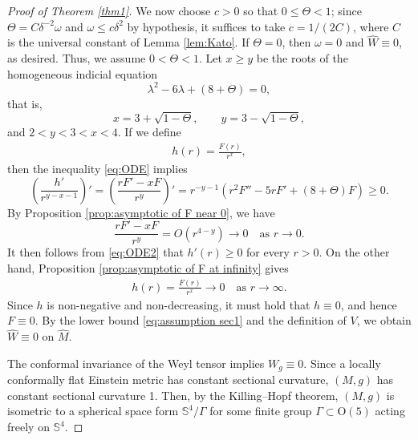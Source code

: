\documentclass[10pt,a4paper]{amsart}
\renewcommand{\S}{\mathbb{S}}
\newcommand{\hm}{\widehat{M}}
\newcommand{\hw}{\widehat{W}}
\newcommand{\wh}[1]{\widehat{#1}}
\begin{document}
\begin{proof}[Proof of Theorem \ref{thm1}]
We now choose $c>0$ so that $0\le \Theta<1$; since $\Theta=C\delta^{-2}\omega$ and $\omega \le c\delta^2$ by hypothesis, it suffices to take $c=1/(2C)$, where $C$ is the universal constant of Lemma \ref{lem:Kato}. If $\Theta=0$, then $\omega=0$ and $\wh{W}\equiv0$, as desired. Thus, we assume $0<\Theta<1$. Let $x\ge y$ be the roots of the homogeneous indicial equation
\begin{equation*}
\lambda^2-6\lambda+(8+\Theta)=0,
\end{equation*}
that is,
\begin{equation*}
x=3+\sqrt{1-\Theta},\qquad y=3-\sqrt{1-\Theta},
\end{equation*}
and $2<y<3<x<4$. If we define
\begin{align*}
h(r)=\frac{F(r)}{r^x},
\end{align*}
then the inequality \eqref{eq:ODE} implies
\begin{equation}\label{eq:ODE2}
\left(\frac{h'}{r^{y-x-1}}\right)'=\left(\frac{rF'-xF}{r^y}\right)'=r^{-y-1}(r^2F''-5rF'+(8+\Theta)F)\ge0.
\end{equation}
By Proposition \ref{prop:asymptotic of F near 0}, we have
\begin{equation*}
\frac{rF'-xF}{r^y}=O(r^{4-y})\rightarrow0\quad\text{as } r\rightarrow0.
\end{equation*}
It then follows from \eqref{eq:ODE2} that $h'(r)\ge0$ for every $r>0$. On the other hand, Proposition \ref{prop:asymptotic of F at infinity} gives 
\begin{align*}
h(r)=\frac{F(r)}{r^x}\rightarrow0\quad\text{as } r\rightarrow\infty. 
\end{align*}
Since $h$ is non-negative and non-decreasing, it must hold that $h\equiv 0$, and hence $F\equiv 0$. By the lower bound \eqref{eq:assumption sec1} and the definition of $V$, we obtain $\hw\equiv0$ on $\hm$.

The conformal invariance of the Weyl tensor implies $W_g\equiv 0$. Since a locally conformally flat Einstein metric has constant sectional curvature, $(M,g)$ has constant sectional curvature 1. Then, by the Killing--Hopf theorem, $(M,g)$ is isometric to a spherical space form $\S^4/\Gamma$ for some finite group $\Gamma\subset \mathrm{O}(5)$ acting freely on $\S^4$.


\end{proof}
\end{document}
